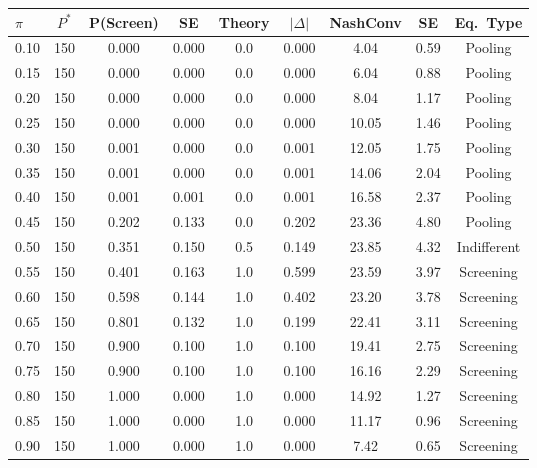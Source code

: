 \begin{tabular}{lcccccccc}
\toprule
$\pi$ & $P^*$ & P(Screen) & SE & Theory & $|\Delta|$ & NashConv & SE & Eq.\ Type \\
\midrule
0.10 & 150 & 0.000 & 0.000 & 0.0 & 0.000 & 4.04 & 0.59 & Pooling \\
0.15 & 150 & 0.000 & 0.000 & 0.0 & 0.000 & 6.04 & 0.88 & Pooling \\
0.20 & 150 & 0.000 & 0.000 & 0.0 & 0.000 & 8.04 & 1.17 & Pooling \\
0.25 & 150 & 0.000 & 0.000 & 0.0 & 0.000 & 10.05 & 1.46 & Pooling \\
0.30 & 150 & 0.001 & 0.000 & 0.0 & 0.001 & 12.05 & 1.75 & Pooling \\
0.35 & 150 & 0.001 & 0.000 & 0.0 & 0.001 & 14.06 & 2.04 & Pooling \\
0.40 & 150 & 0.001 & 0.001 & 0.0 & 0.001 & 16.58 & 2.37 & Pooling \\
0.45 & 150 & 0.202 & 0.133 & 0.0 & 0.202 & 23.36 & 4.80 & Pooling \\
0.50 & 150 & 0.351 & 0.150 & 0.5 & 0.149 & 23.85 & 4.32 & Indifferent \\
0.55 & 150 & 0.401 & 0.163 & 1.0 & 0.599 & 23.59 & 3.97 & Screening \\
0.60 & 150 & 0.598 & 0.144 & 1.0 & 0.402 & 23.20 & 3.78 & Screening \\
0.65 & 150 & 0.801 & 0.132 & 1.0 & 0.199 & 22.41 & 3.11 & Screening \\
0.70 & 150 & 0.900 & 0.100 & 1.0 & 0.100 & 19.41 & 2.75 & Screening \\
0.75 & 150 & 0.900 & 0.100 & 1.0 & 0.100 & 16.16 & 2.29 & Screening \\
0.80 & 150 & 1.000 & 0.000 & 1.0 & 0.000 & 14.92 & 1.27 & Screening \\
0.85 & 150 & 1.000 & 0.000 & 1.0 & 0.000 & 11.17 & 0.96 & Screening \\
0.90 & 150 & 1.000 & 0.000 & 1.0 & 0.000 & 7.42 & 0.65 & Screening \\
\bottomrule
\end{tabular}